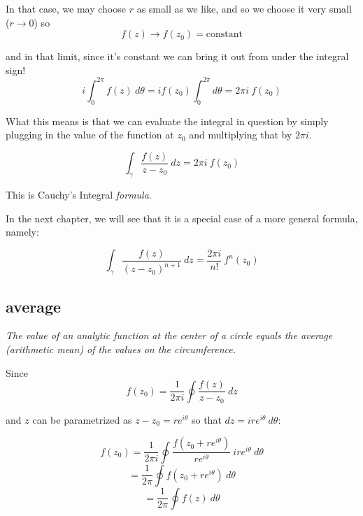 \documentclass[11pt, oneside]{article}
\begin{document}
In that case, we may choose $r$ as small as we like, and so we choose it very small ($r \rightarrow 0$) so
\[ f(z) \rightarrow f(z_0) = \text{constant} \]

and in that limit, since it's constant we can bring it out from under the integral sign!
\[ i \int_0^{2\pi}  f(z) \ d \theta = i f(z_0) \int_0^{2\pi} d \theta = 2 \pi i \ f(z_0) \]

What this means is that we can evaluate the integral in question by simply plugging in the value of the function at $z_0$ and multiplying that by $2 \pi i$.

\[ \int_{\gamma} \frac{f(z)}{z - z_0} \ dz = 2 \pi i \ f(z_0) \]

This is Cauchy's Integral \emph{formula}.

In the next chapter, we will see that it is a special case of a more general formula, namely:

\[ \int_{\gamma} \frac{f(z)}{(z - z_0)^{n+1}} \ dz = \frac{2 \pi i}{n!} \ f^{n} (z_0) \]

\subsection*{average}

\emph{The value of an analytic function at the center of a circle equals the average (arithmetic mean) of the values on the circumference.}

Since
\[ f(z_0) = \frac{1}{2 \pi i} \oint \frac{f(z)}{z - z_0} \ dz \]

and $z$ can be parametrized as $z - z_0 = re^{i \theta}$ so that $dz = i r e^{i \theta} \ d \theta$:

\[ f(z_0) = \frac{1}{2 \pi i} \oint \frac{f(z_0 + re^{i \theta})}{re^{i \theta} } \ i r e^{i \theta} \ d \theta \]
\[ = \frac{1}{2 \pi} \oint f(z_0 + re^{i \theta}) \ d \theta \]
\[ = \frac{1}{2 \pi} \oint f(z) \ d \theta \]
\end{document}
